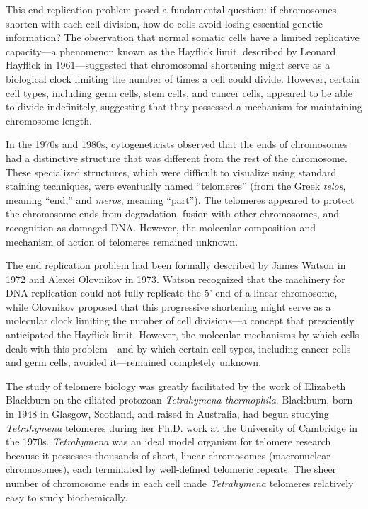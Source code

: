 This end replication problem posed a fundamental question: if chromosomes shorten with each cell division, how do cells avoid losing essential genetic information? The observation that normal somatic cells have a limited replicative capacity---a phenomenon known as the Hayflick limit, described by Leonard Hayflick in 1961---suggested that chromosomal shortening might serve as a biological clock limiting the number of times a cell could divide. However, certain cell types, including germ cells, stem cells, and cancer cells, appeared to be able to divide indefinitely, suggesting that they possessed a mechanism for maintaining chromosome length.

In the 1970s and 1980s, cytogeneticists observed that the ends of chromosomes had a distinctive structure that was different from the rest of the chromosome. These specialized structures, which were difficult to visualize using standard staining techniques, were eventually named ``telomeres'' (from the Greek \textit{telos}, meaning ``end,'' and \textit{meros}, meaning ``part''). The telomeres appeared to protect the chromosome ends from degradation, fusion with other chromosomes, and recognition as damaged DNA. However, the molecular composition and mechanism of action of telomeres remained unknown.

The end replication problem had been formally described by James Watson in 1972 and Alexei Olovnikov in 1973. Watson recognized that the machinery for DNA replication could not fully replicate the 5' end of a linear chromosome, while Olovnikov proposed that this progressive shortening might serve as a molecular clock limiting the number of cell divisions---a concept that presciently anticipated the Hayflick limit. However, the molecular mechanisms by which cells dealt with this problem---and by which certain cell types, including cancer cells and germ cells, avoided it---remained completely unknown.

The study of telomere biology was greatly facilitated by the work of Elizabeth Blackburn on the ciliated protozoan \textit{Tetrahymena thermophila}. Blackburn, born in 1948 in Glasgow, Scotland, and raised in Australia, had begun studying \textit{Tetrahymena} telomeres during her Ph.D. work at the University of Cambridge in the 1970s. \textit{Tetrahymena} was an ideal model organism for telomere research because it possesses thousands of short, linear chromosomes (macronuclear chromosomes), each terminated by well-defined telomeric repeats. The sheer number of chromosome ends in each cell made \textit{Tetrahymena} telomeres relatively easy to study biochemically.

